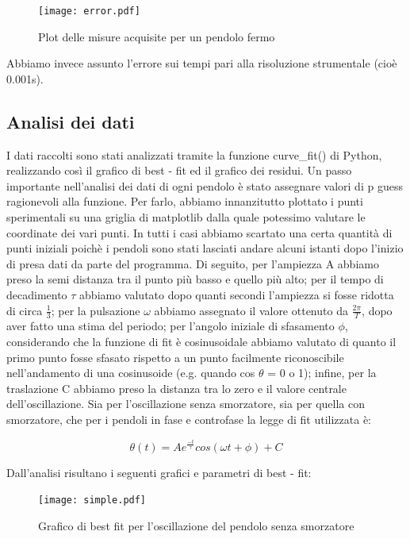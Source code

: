 \documentclass{article}
\begin{document}
\begin{figure} [H]
    \centering
    \texttt{[image: error.pdf]}
    \caption{Plot delle misure acquisite per un pendolo fermo}
    \label{fig:my_label}
\end{figure}

Abbiamo invece assunto l'errore sui tempi pari alla risoluzione strumentale (cioè 0.001s). 
\vspace{1em}

\subsection{Analisi dei dati}
I dati raccolti sono stati analizzati tramite la funzione curve\_fit() di Python, realizzando così il grafico di best - fit ed il grafico dei residui. Un passo importante nell'analisi dei dati di ogni pendolo è stato assegnare valori di p guess ragionevoli alla funzione. Per farlo, abbiamo innanzitutto plottato i punti sperimentali su una griglia di matplotlib dalla quale potessimo valutare le coordinate dei vari punti. In tutti i casi abbiamo scartato una certa quantità di punti iniziali poichè i pendoli sono stati lasciati andare alcuni istanti dopo l'inizio di presa dati da parte del programma. Di seguito, per l'ampiezza A abbiamo preso la semi distanza tra il punto più basso e quello più alto; per il tempo di decadimento $\tau$ abbiamo valutato dopo quanti secondi l'ampiezza si fosse ridotta di circa $\frac{1}{3}$; per la pulsazione $\omega$ abbiamo assegnato il valore ottenuto da $\frac{2\pi}{T}$, dopo aver fatto una stima del periodo; per l'angolo iniziale di sfasamento $\phi$, considerando che la funzione di fit è cosinusoidale abbiamo valutato di quanto il primo punto fosse sfasato rispetto a un punto facilmente riconoscibile nell'andamento di una cosinusoide (e.g. quando cos $\theta$ = 0 o 1); infine, per la traslazione C abbiamo preso la distanza tra lo zero e il valore centrale dell'oscillazione. Sia per l'oscillazione senza smorzatore, sia per quella con smorzatore, che per i pendoli in fase e controfase la legge di fit utilizzata è:

\begin{equation}
    \theta(t) = Ae^{\frac{-t}{\tau}}cos(\omega t + \phi) + C
    \label{pendolo singolo}
\end{equation}

Dall'analisi risultano i seguenti grafici e parametri di best - fit:

\begin{figure} [H]
    \centering
    \texttt{[image: simple.pdf]}
    \caption{Grafico di best fit per l'oscillazione del pendolo senza smorzatore}
    \label{fig:my_label}
\end{figure}
\end{document}
